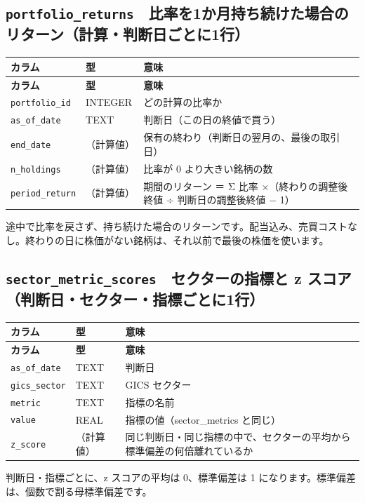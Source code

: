 \documentclass[xelatex,ja=standard,jafont=hiragino-pron,a4paper,10pt]{bxjsreport}
\begin{document}
\subsection*{\texttt{portfolio\_\allowbreak{}returns}　比率を1か月持ち続けた場合のリターン（計算・判断日ごとに1行）}
{\footnotesize
\begin{longtable}{p{3.60cm}p{1.80cm}p{8.90cm}}
\toprule
\textbf{カラム} & \textbf{型} & \textbf{意味} \\
\midrule
\endfirsthead
\toprule
\textbf{カラム} & \textbf{型} & \textbf{意味} \\
\midrule
\endhead
\bottomrule
\endfoot
\texttt{portfolio\_\allowbreak{}id} & INTEGER & どの計算の比率か \\
\texttt{as\_\allowbreak{}of\_\allowbreak{}date} & TEXT & 判断日（この日の終値で買う） \\
\texttt{end\_\allowbreak{}date} & （計算値） & 保有の終わり（判断日の翌月の、最後の取引日） \\
\texttt{n\_\allowbreak{}holdings} & （計算値） & 比率が 0 より大きい銘柄の数 \\
\texttt{period\_\allowbreak{}return} & （計算値） & 期間のリターン ＝ Σ 比率 ×（終わりの調整後終値 ÷ 判断日の調整後終値 − 1） \\
\end{longtable}
}
{\small 途中で比率を戻さず、持ち続けた場合のリターンです。配当込み、売買コストなし。終わりの日に株価がない銘柄は、それ以前で最後の株価を使います。\par}
\medskip
\subsection*{\texttt{sector\_\allowbreak{}metric\_\allowbreak{}scores}　セクターの指標と z スコア（判断日・セクター・指標ごとに1行）}
{\footnotesize
\begin{longtable}{p{3.60cm}p{1.80cm}p{8.90cm}}
\toprule
\textbf{カラム} & \textbf{型} & \textbf{意味} \\
\midrule
\endfirsthead
\toprule
\textbf{カラム} & \textbf{型} & \textbf{意味} \\
\midrule
\endhead
\bottomrule
\endfoot
\texttt{as\_\allowbreak{}of\_\allowbreak{}date} & TEXT & 判断日 \\
\texttt{gics\_\allowbreak{}sector} & TEXT & GICS セクター \\
\texttt{metric} & TEXT & 指標の名前 \\
\texttt{value} & REAL & 指標の値（sector\_metrics と同じ） \\
\texttt{z\_\allowbreak{}score} & （計算値） & 同じ判断日・同じ指標の中で、セクターの平均から標準偏差の何倍離れているか \\
\end{longtable}
}
{\small 判断日・指標ごとに、z スコアの平均は 0、標準偏差は 1 になります。標準偏差は、個数で割る母標準偏差です。\par}
\medskip
\end{document}
